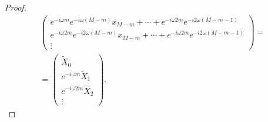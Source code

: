 \begin{proof}
\begin{eqnarray}
\begin{pmatrix}
e^{-i \omega m } e^{-i \omega \left( M - m \right) } x_{M - m} + 
\cdots + 
e^{-i \omega 2 m } e^{-i 2 \omega \left( M - m - 1\right) }\\ 
e^{-i \omega 2 m } e^{-i 2 \omega \left( M - m \right) } x_{M - m} + 
\cdots + 
e^{-i \omega 2 m } e^{-i 2 \omega \left( M - m - 1\right) }\\ 
\vdots 
\end{pmatrix} = 
\nonumber \\
= 
\begin{pmatrix}
\tilde{X}_0 \\
e^{-i \omega m} \tilde{X}_1 \\
e^{-i \omega 2 m} \tilde{X}_2 \\
\vdots  
\end{pmatrix}.
\nonumber
\end{eqnarray}
\end{proof}


